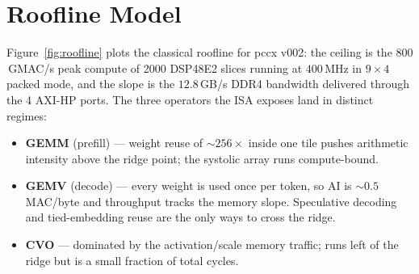 \documentclass[11pt,a4paper,twoside,openany]{report}
\begin{document}
\section{Roofline Model}

Figure~\ref{fig:roofline} plots the classical roofline for pccx v002:
the ceiling is the $800$\,GMAC/s peak compute of 2000 DSP48E2 slices
running at $400$\,MHz in $9 \times 4$ packed mode, and the slope is
the $12.8$\,GB/s DDR4 bandwidth delivered through the 4 AXI-HP ports.
The three operators the ISA exposes land in distinct regimes:

\begin{itemize}[label={\color{oceanblue}\textbullet}, leftmargin=*, itemsep=0.3ex]
    \item \textbf{GEMM} (prefill) — weight reuse of $\sim 256 \times$
          inside one tile pushes arithmetic intensity above the ridge
          point; the systolic array runs compute-bound.
    \item \textbf{GEMV} (decode) — every weight is used once per
          token, so AI is $\sim 0.5$ MAC/byte and throughput tracks
          the memory slope.  Speculative decoding and tied-embedding
          reuse are the only ways to cross the ridge.
    \item \textbf{CVO} — dominated by the activation/scale memory
          traffic; runs left of the ridge but is a small fraction of
          total cycles.
\end{itemize}
\end{document}
